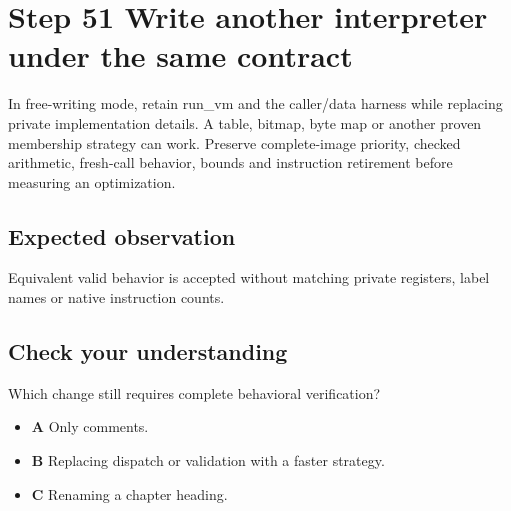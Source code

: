 \section{Step 51 Write another interpreter under the same contract}\label{vm-s51}

In free-writing mode, retain run\_vm and the caller/data harness while replacing private implementation details. A table, bitmap, byte map or another proven membership strategy can work. Preserve complete-image priority, checked arithmetic, fresh-call behavior, bounds and instruction retirement before measuring an optimization.

\subsection{Expected observation}
Equivalent valid behavior is accepted without matching private registers, label names or native instruction counts.

\subsection{Check your understanding}
Which change still requires complete behavioral verification?

\begin{itemize}
  \item \textbf{A} Only comments.
  \item \textbf{B} Replacing dispatch or validation with a faster strategy.
  \item \textbf{C} Renaming a chapter heading.
\end{itemize}
